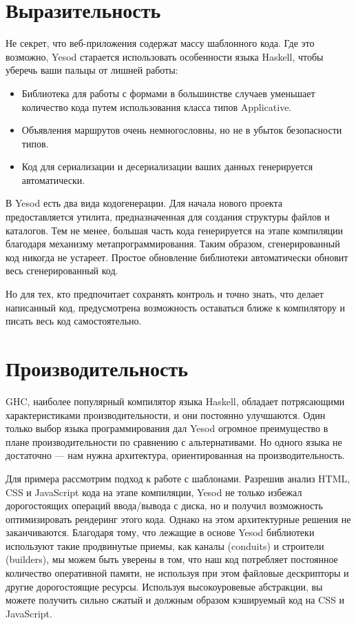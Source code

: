\section{Выразительность}

Не секрет, что веб-приложения содержат массу шаблонного кода. Где это возможно, Yesod старается использовать особенности языка Haskell, чтобы уберечь ваши пальцы от лишней работы:

\begin{itemize}
  \item Библиотека для работы с формами в большинстве случаев уменьшает количество кода путем использования класса типов Applicative.
  \item Объявления маршрутов очень немногословны, но не в убыток безопасности типов.
  \item Код для сериализации и десериализации ваших данных генерируется автоматически.
\end{itemize}

В Yesod есть два вида кодогенерации. Для начала нового проекта предоставляется утилита, предназначенная для создания структуры файлов и каталогов. Тем не менее, большая часть кода генерируется на этапе компиляции благодаря механизму метапрограммирования. Таким образом, сгенерированный код никогда не устареет. Простое обновление библиотеки автоматически обновит весь сгенерированный код.

Но для тех, кто предпочитает сохранять контроль и точно знать, что делает написанный код, предусмотрена возможность оставаться ближе к компилятору и писать весь код самостоятельно.

\section{Производительность}

GHC, наиболее популярный компилятор языка Haskell, обладает потрясающими характеристиками производительности, и они постоянно улучшаются. Один только выбор языка программирования дал Yesod огромное преимущество в плане производительности по сравнению с альтернативами. Но одного языка не достаточно --- нам нужна архитектура, ориентированная на производительность.

Для примера рассмотрим подход к работе с шаблонами. Разрешив анализ HTML, CSS и JavaScript кода на этапе компиляции, Yesod не только избежал дорогостоящих операций ввода/вывода с диска, но и получил возможность оптимизировать рендеринг этого кода. Однако на этом архитектурные решения не заканчиваются. Благодаря тому, что лежащие в основе Yesod библиотеки используют такие продвинутые приемы, как каналы (conduits) и строители (builders), мы можем быть уверены в том, что наш код потребляет постоянное количество оперативной памяти, не используя при этом файловые дескрипторы и другие дорогостоящие ресурсы. Используя высокоуровевые абстракции, вы можете получить сильно сжатый и должным образом кэшируемый код на CSS и JavaScript.

